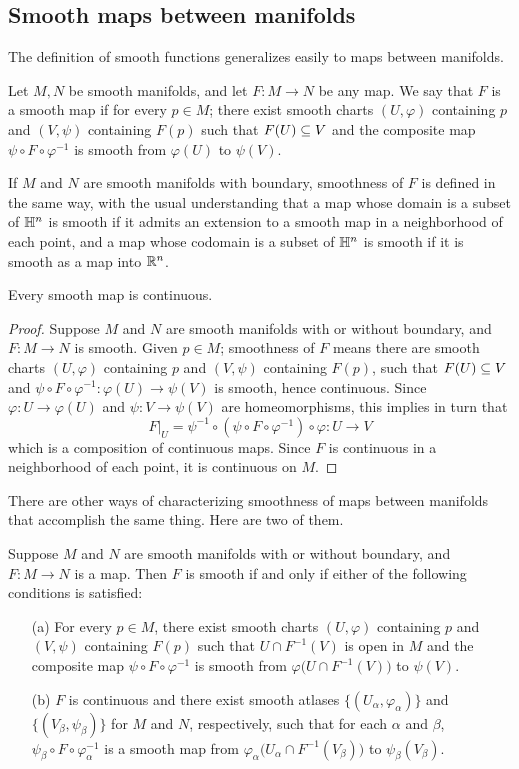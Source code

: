 \subsection{Smooth maps between manifolds}
The definition of smooth functions generalizes easily to maps between manifolds.\par
Let $M,N$ be smooth manifolds, and let $F:M\to N$ be any map. We say that $F$ is a smooth map if for every $p\in M$; there exist smooth charts $(U,\varphi)$ containing $p$ and $(V,\psi)$ containing $F(p)$ such that $F(U)\subseteq V$ and the composite map $\psi\circ F\circ\varphi^{-1}$ is smooth from $\varphi(U)$ to $\psi(V)$.\par
If $M$ and $N$ are smooth manifolds with boundary, smoothness of $F$ is defined in the same way, with the usual understanding that a map whose domain is a subset of $\mathbb{H}^n$ is smooth if it admits an extension to a smooth map in a neighborhood of each point, and a map whose codomain is a subset of $\mathbb{H}^n$ is smooth if it is smooth as a map into $\mathbb{R}^n$.
\begin{proposition}
Every smooth map is continuous.
\end{proposition}
\begin{proof}
Suppose $M$ and $N$ are smooth manifolds with or without boundary, and $F:M\to N$ is smooth. Given $p\in M$; smoothness of $F$ means there are smooth charts $(U,\varphi)$ containing $p$ and $(V,\psi)$ containing $F(p)$, such that $F(U)\subseteq V$ and $\psi\circ F\circ\varphi^{-1}:\varphi(U)\to\psi(V)$ is smooth, hence continuous. Since $\varphi:U\to\varphi(U)$ and $\psi:V\to\psi(V)$ are homeomorphisms, this implies in turn that
\[F|_U=\psi^{-1}\circ(\psi\circ F\circ\varphi^{-1})\circ\varphi:U\to V\]
which is a composition of continuous maps. Since $F$ is continuous in a neighborhood of each point, it is continuous on $M$.
\end{proof}
There are other ways of characterizing smoothness of maps between manifolds that accomplish the same thing. Here are two of them.
\begin{proposition}
Suppose $M$ and $N$ are smooth manifolds with or without boundary, and $F:M\to N$ is a map. Then $F$ is smooth if and only if either of the following conditions is satisfied:
\begin{itemize}
\item[(a)] For every $p\in M$, there exist smooth charts $(U,\varphi)$ containing $p$ and $(V,\psi)$ containing $F(p)$ such that $U\cap F^{-1}(V)$ is open in $M$ and the composite map $\psi\circ F\circ\varphi^{-1}$ is smooth from $\varphi\big(U\cap F^{-1}(V)\big)$ to $\psi(V)$.
\item[(b)] $F$ is continuous and there exist smooth atlases $\{(U_\alpha,\varphi_\alpha)\}$ and $\{(V_\beta,\psi_\beta)\}$ for $M$ and $N$, respectively, such that for each $\alpha$ and $\beta$, $\psi_\beta\circ F\circ\varphi_\alpha^{-1}$ is a smooth map from $\varphi_\alpha\big(U_\alpha\cap F^{-1}(V_\beta)\big)$ to $\psi_\beta(V_\beta)$.
\end{itemize}
\end{proposition}
